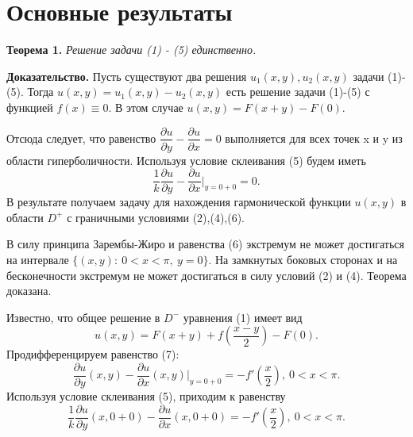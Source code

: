 \documentclass[9pt]{article}
\begin{document}
	\section{Основные результаты}
		\textbf{Теорема 1.} \textit{Решение задачи (1) - (5) единственно.}
		
	\textbf{Доказательство.} 
	Пусть существуют два решения $u_1(x,y), u_2(x,y)$ задачи (1)-(5). Тогда $u(x,y) = u_1(x,y) - u_2(x,y)$ есть решение задачи (1)-(5) с функцией $f(x) \equiv 0$. В этом случае $u(x,y) = F(x+y) - F(0)$.
	
	Отсюда следует, что равенство $\dfrac{\partial u}{\partial y} - \dfrac{\partial u}{\partial x} = 0$ выполняется для всех точек x и y из области гиперболичности. Используя условие склеивания  (5) будем иметь
	\begin{equation}
		\dfrac1{k} \dfrac{\partial u}{\partial y} - \dfrac{\partial u}{\partial x}\vert_{y=0+0} = 0.
	\end{equation}
	В результате получаем задачу для нахождения гармонической функции $u(x,y)$ в области $D^{+}$ с граничными условиями (2),(4),(6).
	
	В силу принципа Зарембы-Жиро и равенства (6) экстремум не может достигаться на интервале $\{(x,y):\ 0 < x < \pi, \ y = 0\}$. На замкнутых боковых сторонах и на бесконечности экстремум не может достигаться в силу условий (2) и (4). Теорема доказана.
	
	Известно, что общее решение в $D^{-}$  уравнения (1) имеет вид 
	\begin{equation}
		u(x,y) = F(x+y) + f(\dfrac{x-y}{2}) - F(0).
	\end{equation}
	Продифференцируем равенство (7):
	\begin{equation*}
		\dfrac{\partial u}{\partial y}(x,y) - \dfrac{\partial u}{\partial x}(x,y) \vert_{y=0+0} = -f'\left(\dfrac{x}2\right), \ 0 < x < \pi.
	\end{equation*}
	Используя условие склеивания (5), приходим к равенству
	\begin{equation*}
		\dfrac{1}{k} \dfrac{\partial u}{\partial y}(x, 0+0) - \dfrac{\partial u}{\partial x}(x, 0 + 0) = - f'\left(\dfrac{x}2\right), \ 0 < x < \pi. 
	\end{equation*}
	
\end{document}
